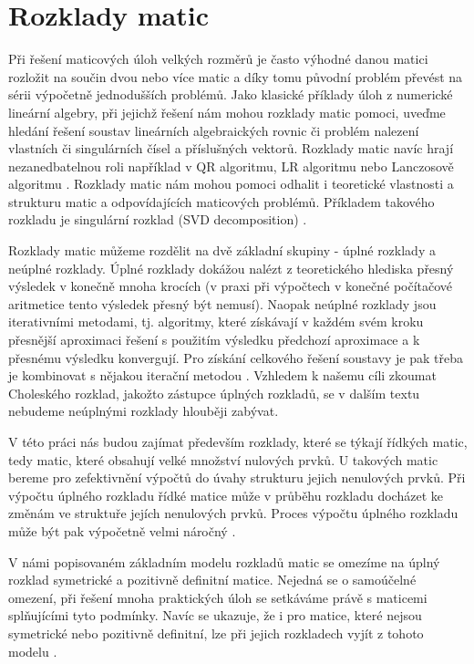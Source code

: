 \documentclass[11pt,american,czech,oneside]{book}
\theoremstyle{plain}
\theoremstyle{definition}
\begin{document}

\chapter{Rozklady matic}

Při řešení maticových úloh velkých rozměrů je často výhodné danou matici rozložit na součin dvou nebo více matic a díky tomu původní problém převést na sérii výpočetně jednodušších problémů. Jako klasické příklady úloh z numerické lineární algebry, při jejichž řešení nám mohou rozklady matic pomoci, uveďme hledání řešení soustav lineárních algebraických rovnic či problém nalezení vlastních či singulárních čísel a příslušných vektorů. Rozklady matic navíc hrají nezanedbatelnou roli například v QR algoritmu, LR algoritmu \cite{govl:83} nebo Lanczosově algoritmu \cite{lanc:50,paig:72}. Rozklady matic nám mohou pomoci odhalit i teoretické vlastnosti a strukturu matic a odpovídajících maticových problémů. Příkladem takového rozkladu je singulární rozklad (SVD decomposition) \cite{govl:83}.

Rozklady matic můžeme rozdělit na dvě základní skupiny - úplné rozklady a neúplné rozklady. Úplné rozklady dokážou nalézt z teoretického hlediska přesný výsledek v konečně mnoha krocích (v praxi při výpočtech v konečné počítačové aritmetice tento výsledek přesný být nemusí). Naopak neúplné rozklady jsou iterativními metodami, tj. algoritmy, které získávají v každém svém kroku přesnější aproximaci řešení s použitím výsledku předchozí aproximace a k přesnému výsledku konvergují. Pro získání celkového řešení soustavy je pak třeba je kombinovat s nějakou iterační metodou \cite{temp94}. Vzhledem k našemu cíli zkoumat Choleského rozklad, jakožto zástupce úplných rozkladů, se v dalším textu nebudeme neúplnými rozklady hlouběji zabývat. 

V této práci nás budou zajímat především rozklady, které se týkají řídkých matic, tedy matic, které obsahují velké množství nulových prvků. U takových matic bereme pro zefektivnění výpočtů do úvahy strukturu jejich nenulových prvků. Při výpočtu úplného rozkladu řídké matice může v průběhu rozkladu docházet ke změnám ve struktuře jejích nenulových prvků. Proces výpočtu úplného rozkladu může být pak výpočetně velmi náročný \cite{duiare:86}.

V námi popisovaném základním modelu rozkladů matic se omezíme na úplný rozklad symetrické a pozitivně definitní matice. Nejedná se o samoúčelné omezení, při řešení mnoha praktických úloh se setkáváme právě s maticemi splňujícími tyto podmínky. Navíc se ukazuje, že i pro matice, které nejsou symetrické nebo pozitivně definitní, lze při jejich rozkladech vyjít z tohoto modelu \cite{dara:16}.
\end{document}
